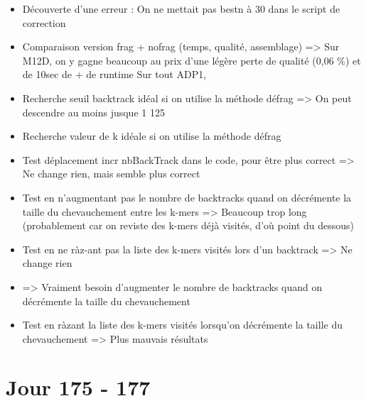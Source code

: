 \documentclass[12pt]{report}
\begin{document}
\begin{itemize}	
	\item Découverte d'une erreur : On ne mettait pas bestn à 30 dans le script de correction
	
	\item Comparaison version frag + nofrag (temps, qualité, assemblage) => 
		  Sur M12D, on y gagne beaucoup au prix d'une légère perte de qualité (0,06 \%) et de 10sec de + de runtime
		  Sur tout ADP1, 	
	
	\item Recherche seuil backtrack idéal si on utilise la méthode défrag => On peut descendre au moins jusque 1 125
	
	\item Recherche valeur de k idéale si on utilise la méthode défrag
	
	\item Test déplacement incr nbBackTrack dans le code, pour être plus correct => Ne change rien, mais semble plus correct
	
	\item Test en n'augmentant pas le nombre de backtracks quand on décrémente la taille du chevauchement entre les k-mers
		  => Beaucoup trop long (probablement car on reviste des k-mers déjà visités, d'où point du dessous)
	
	\item Test en ne ràz-ant pas la liste des k-mers visités lors d'un backtrack => Ne change rien
	
	\item => Vraiment besoin d'augmenter le nombre de backtracks quand on décrémente la taille du chevauchement
	
	\item Test en ràzant la liste des k-mers visités lorsqu'on décrémente la taille du chevauchement => Plus mauvais résultats
\end{itemize}

\section{Jour 175 - 177}
\end{document}
